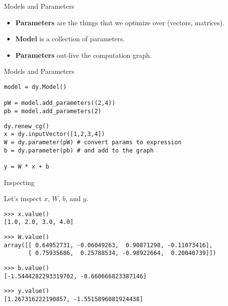 \documentclass[compress]{beamer}
\begin{document}
\begin{frame}{Models and Parameters}

\begin{itemize}
  \item {\bf Parameters} are the things that we optimize over (vectors, matrices).
  \item {\bf Model} is a collection of parameters.
  \item {\bf Parameters} out-live the computation graph.
\end{itemize}

\end{frame}

\begin{frame}[fragile]{Models and Parameters}

\begin{verbatim}
model = dy.Model()

pW = model.add_parameters((2,4))
pb = model.add_parameters(2)
\end{verbatim}

\begin{verbatim}
dy.renew_cg()
x = dy.inputVector([1,2,3,4])
W = dy.parameter(pW) # convert params to expression
b = dy.parameter(pb) # and add to the graph

y = W * x + b
\end{verbatim}

\end{frame}

\begin{frame}[fragile]{Inspecting}

Let's inspect \alert<1>{$x$}, \alert<2>{$W$}, \alert<3>{$b$}, and \alert<4>{$y$}.
\pause
\begin{verbatim}
>>> x.value()
[1.0, 2.0, 3.0, 4.0]
\end{verbatim}
\pause
\begin{verbatim}
>>> W.value()
array([[ 0.64952731, -0.06049263,  0.90871298, -0.11073416],
       [ 0.75935686,  0.25788534, -0.98922664,  0.20040739]])
\end{verbatim}
\pause
\begin{verbatim}
>>> b.value()
[-1.5444282293319702, -0.660666823387146]
\end{verbatim}
\pause
\begin{verbatim}
>>> y.value()
[1.267316222190857, -1.5515896081924438]
\end{verbatim}

\end{frame}
\end{document}
